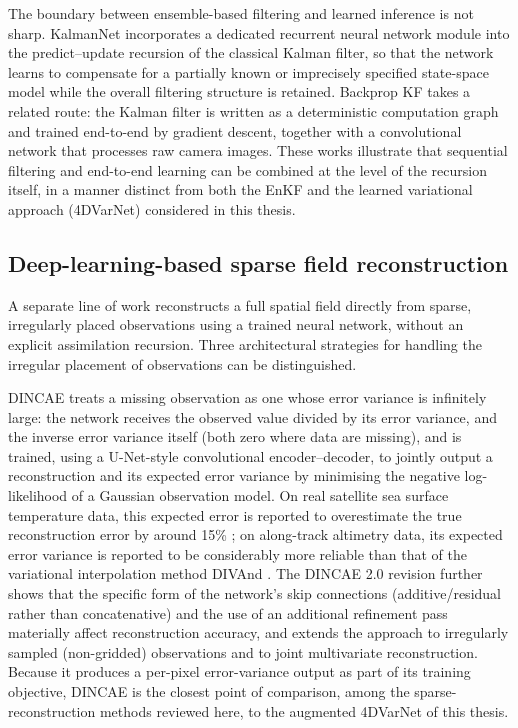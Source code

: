 \documentclass[english, 12pt, a4paper, elec, utf8, a-2b, online]{aaltothesis}
\begin{document}
The boundary between ensemble-based filtering and learned inference
is not sharp. KalmanNet \cite{revach2022kalmannet} incorporates a
dedicated recurrent neural network module into the predict--update
recursion of the classical Kalman filter, so that the network learns
to compensate for a partially known or imprecisely specified
state-space model while the overall filtering structure is
retained. Backprop KF \cite{haarnoja2016backpropkf} takes a related
route: the Kalman filter is written as a deterministic computation
graph and trained end-to-end by gradient descent, together with a
convolutional network that processes raw camera images. These works
illustrate that sequential filtering and end-to-end
learning can be combined at the level of the recursion itself, in a
manner distinct from both the EnKF and the learned
variational approach (4DVarNet) considered in this thesis.

\subsection{Deep-learning-based sparse field reconstruction}
\label{sec:rw_sparse}

A separate line of work reconstructs a full spatial field directly
from sparse, irregularly placed observations using a trained neural
network, without an explicit assimilation recursion. Three
architectural strategies for handling the irregular placement of
observations can be distinguished.

DINCAE \cite{barth2020dincae1, barth2022dincae2} treats a missing
observation as one whose error variance is infinitely large: the
network receives the observed value divided by its error variance,
and the inverse error variance itself (both zero where data are
missing), and is trained, using a U-Net-style convolutional
encoder--decoder, to jointly output a reconstruction and its
expected error variance by minimising the negative log-likelihood of
a Gaussian observation model. On real satellite sea surface
temperature data, this expected error is reported to overestimate
the true reconstruction error by around 15\% \cite{barth2020dincae1};
on along-track altimetry data, its expected error variance is reported
to be considerably more reliable than that of the variational
interpolation method DIVAnd \cite{barth2022dincae2}. The DINCAE
2.0 revision \cite{barth2022dincae2} further shows that the specific
form of the network's skip connections (additive/residual rather
than concatenative) and the use of an additional refinement pass
materially affect reconstruction accuracy, and extends the approach
to irregularly sampled (non-gridded) observations and to joint
multivariate reconstruction. Because it produces a per-pixel
error-variance output as part of its training objective, DINCAE is
the closest point of comparison, among the sparse-reconstruction
methods reviewed here, to the augmented 4DVarNet of
this thesis.
\end{document}
